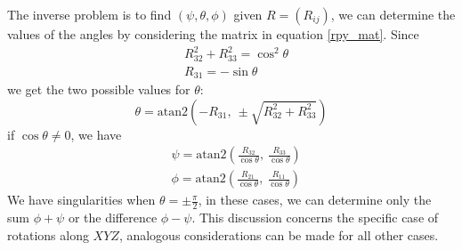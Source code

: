 \documentclass[10pt, letterpaper]{report}
\begin{document}
The inverse problem is to find $(\psi,\theta,\phi)$ given $R=(R_{ij})$, we can determine the values of the angles by considering the matrix in equation \eqref{rpy_mat}. Since\begin{align}
    &R_{32}^2+R_{33}^2=\cos^2\theta \\ 
    &R_{31}=-\sin\theta  
\end{align}
we get the two possible values for $\theta$:\begin{equation}
    \theta=\text{atan2}\left(
        -R_{31}, \ \pm\sqrt{R_{32}^2+R_{33}^2}
    \right)
\end{equation}
if $\cos\theta\ne 0$, we have\begin{align}
    & \psi=\text{atan2}\left(
        \frac{R_{32}}{\cos\theta}, \ \frac{R_{33}}{\cos\theta}
    \right)\\ 
     & \phi=\text{atan2}\left(
        \frac{R_{21}}{\cos\theta}, \ \frac{R_{11}}{\cos\theta}
    \right)
\end{align}
We have singularities when $\theta=\pm\frac{\pi}{2}$, in these cases, we can determine only the sum $\phi+\psi$ or the difference $\phi-\psi$. This discussion concerns the specific case of rotations along $XYZ$, analogous considerations can be made for all other cases.
\end{document}
